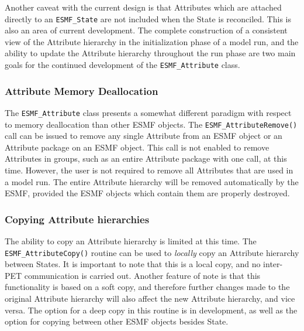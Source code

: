 Another caveat with the current design is that Attributes which are attached directly to an {\tt ESMF\_State} are not included when the State is reconciled.  This is also an area of current development.  The complete construction of a consistent view of the Attribute hierarchy in the initialization phase of a model run, and the ability to update the Attribute hierarchy throughout the run phase are two main goals for the continued development of the {\tt ESMF\_Attribute} class.

\subsubsection{Attribute Memory Deallocation}

The {\tt ESMF\_Attribute} class presents a somewhat different paradigm with respect to memory deallocation than other ESMF objects.  The {\tt ESMF\_AttributeRemove()} call can be issued to remove any single Attribute from an ESMF object or an Attribute package on an ESMF object.  This call is not enabled to remove Attributes in groups, such as an entire Attribute package with one call, at this time.  However, the user is not required to remove all Attributes that are used in a model run.  The entire Attribute hierarchy will be removed automatically by the ESMF, provided the ESMF objects which contain them are properly destroyed.  

\subsubsection{Copying Attribute hierarchies}

The ability to copy an Attribute hierarchy is limited at this time.  The {\tt ESMF\_AttributeCopy()} routine can be used to {\it locally} copy an Attribute hierarchy between States.  It is important to note that this is a local copy, and no inter-PET communication is carried out.  Another feature of note is that this functionality is based on a soft copy, and therefore further changes made to the original Attribute hierarchy will also affect the new Attribute hierarchy, and vice versa.  The option for a deep copy in this routine is in development, as well as the option for copying between other ESMF objects besides State.  